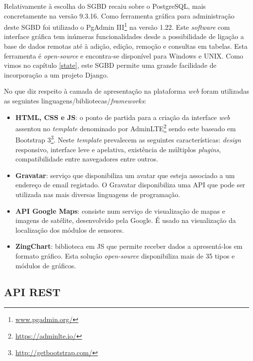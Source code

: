 Relativamente à escolha do \ac{SGBD} recaiu sobre o PostgreSQL, mais concretamente na versão 9.3.16. Como ferramenta gráfica para administração deste \ac{SGBD} foi utilizado o PgAdmin III\footnote{\url{www.pgadmin.org/}} na versão 1.22. Este \textit{software} com interface gráfica tem inúmeras funcionalidades desde a possibilidade de ligação a base de dados remotas até à adição, edição, remoção e  consultas em tabelas. Esta ferramenta é \textit{open-source} e encontra-se disponível para Windows e UNIX. Como vimos no capítulo \ref{state}, este \ac{SGBD} permite uma grande facilidade de incorporação a um projeto Django. 


No que diz respeito à camada de apresentação na plataforma \textit{web} foram utilizadas as seguintes linguagens/bibliotecas/\textit{frameworks}: 

\begin{itemize}
	\item \textbf{\acs{HTML}, \acs{CSS} e \acs{JS}}: o ponto de partida para a criação da interface \textit{web} assentou no \textit{template} denominado por AdminLTE\footnote{\url{https://adminlte.io/}} sendo este baseado em Bootstrap 3\footnote{\url{http://getbootstrap.com/}}. Neste \textit{template} prevalecem as seguintes características:  \textit{design} responsivo, interface leve e apelativa, existência de múltiplos \textit{plugins}, compatibilidade entre navegadores entre outros. 
	
	\item \textbf{Gravatar}: serviço que disponibiliza um avatar que esteja associado a um endereço de email registado. O Gravatar disponibiliza uma \ac{API} que pode ser utilizada nas mais diversas linguagens de programação\cite{gravatar}.
	 
	\item \textbf{\ac{API} Google Maps}: consiste num serviço de visualização de mapas e imagens de satélite, desenvolvido pela Google. É usado na visualização da localização dos módulos de sensores. 
	
	\item \textbf{ZingChart}: biblioteca em \ac{JS} que permite receber dados a apresentá-los em formato gráfico. Esta solução \textit{open-source} disponibiliza mais de 35 tipos e módulos de gráficos. 
\end{itemize}





\subsection{\acs{API} \acs{REST}}


